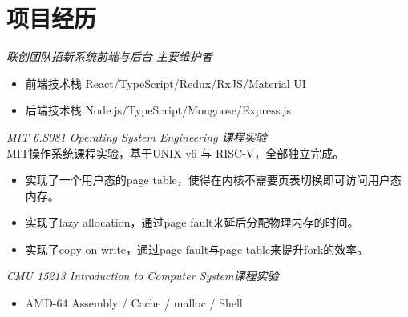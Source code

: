 \documentclass{uniquecv}
\begin{document}

\section{项目经历}

{\it 联创团队招新系统前端与后台}
\quad \emph{主要维护者}
\vspace{0.4ex}

\begin{itemize}
  \item 前端技术栈 React/TypeScript/Redux/RxJS/Material UI
  \item 后端技术栈 Node.js/TypeScript/Mongoose/Express.js
\end{itemize}

{\it MIT 6.S081 Operating System Engineering 课程实验}
\vspace{0.4ex}
\\
MIT操作系统课程实验，基于UNIX v6 与 RISC-V，全部独立完成。
\begin{itemize}
  \item 实现了一个用户态的page table，使得在内核不需要页表切换即可访问用户态内存。
  \item 实现了lazy allocation，通过page fault来延后分配物理内存的时间。
  \item 实现了copy on write，通过page fault与page table来提升fork的效率。
\end{itemize}

{\it CMU 15213 Introduction to Computer System课程实验}
\vspace{0.4ex}
\begin{itemize}
  \item AMD-64 Assembly / Cache / malloc / Shell
\end{itemize}
%
\end{document}
